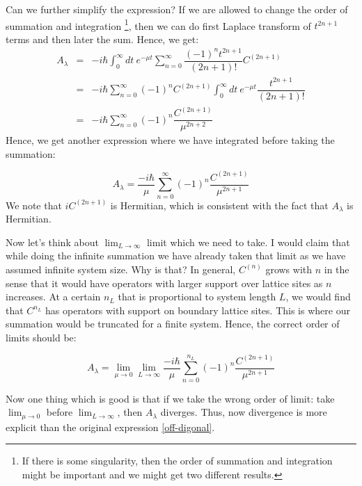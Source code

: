\documentclass[11pt,a4paper]{article}
\begin{document}
Can we further simplify the expression? If we are allowed to change the order of summation and integration \footnote{If there is some singularity, then the order of summation and integration might be important and we might get two different results.}, then we can do first Laplace transform of $t ^{2n+1}$  terms and then later the sum.  Hence, we get:
\begin{eqnarray}
A_{\lambda} &=& - i\hbar \int_0^{\infty} dt\ e^{-\mu t} \sum_{n=0}^{\infty} \dfrac{(-1)^{n} t ^{2n+1}}{(2n+1)!} C^{(2n+1)} \\
 &=& - i\hbar  \sum_{n=0}^{\infty}(-1)^{n} C^{(2n+1)} \int_0^{\infty} dt\ e^{-\mu t}  \dfrac{ t ^{2n+1}}{(2n+1)!} \\
 &=& - i\hbar  \sum_{n=0}^{\infty}   (-1)^{n} \dfrac{ C^{(2n+1)}}{\mu^{2n+2}}
\end{eqnarray}
Hence, we get another expression where we have integrated before taking the summation:

\begin{equation}
 A_{\lambda} =  \dfrac{-i\hbar}{\mu}  \sum_{n=0}^{\infty}   (-1)^{n} \dfrac{ C^{(2n+1)}}{\mu^{2n+1}}
\label{def_2}
\end{equation}
We note that $i C^{(2n+1)}$ is Hermitian, which is consistent with the fact that $ A_{\lambda}$ is Hermitian. 


Now let's think about $\lim_{L \rightarrow \infty }$ limit which we need to take. I  would claim that while doing the infinite summation we have already taken that limit as we have assumed infinite system size. Why is that? In general,  $C^{(n)}$ grows with $n$ in the sense that it would have operators with larger support over lattice sites as $n$ increases. At a certain  $n_L$ that is proportional to system length $L$, we would find that $C^{n_L}$ has operators with support on boundary lattice sites. This is where our summation would be truncated for a finite system. Hence, the correct order of limits should be:

\begin{equation}
\boxed{ A_{\lambda} =   \lim_{\mu \rightarrow 0} \lim_{L \rightarrow \infty } \dfrac{-i\hbar}{\mu}  \sum_{n=0}^{n_L}   (-1)^{n} \dfrac{ C^{(2n+1)}}{\mu^{2n+1}}}
\end{equation}

Now one thing which is good is that if we take the wrong order of limit: take $\lim_{\mu \rightarrow 0}$ before $\lim_{L \rightarrow \infty }$, then $A_{\lambda}$ diverges. Thus, now divergence is more explicit than the original expression \ref{off-digonal}. 
\end{document}
